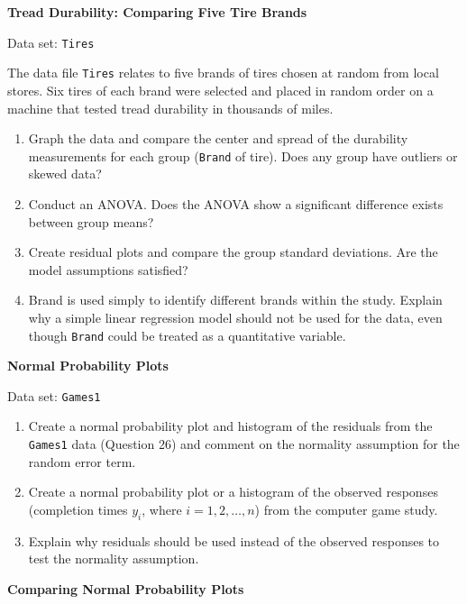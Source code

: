 \documentclass[
]{report}
\begin{document}
\begin{list}{E..}{ \setlength{\itemsep}{1.2em}}
  \item \textbf{Tread Durability: Comparing Five Tire Brands}

Data set: \texttt{Tires}

The data file \texttt{Tires} relates to five brands of tires chosen at random from local stores. Six tires of each brand were selected and placed in random order on a machine that tested tread durability in thousands of miles.

    \begin{enumerate}
      \item Graph the data and compare the center and spread of the durability measurements for each group (\texttt{Brand} of tire). Does any group have outliers or skewed data?
      \item Conduct an ANOVA. Does the ANOVA show a significant difference exists between group means?
      \item Create residual plots and compare the group standard deviations. Are the model assumptions satisfied?
      \item Brand is used simply to identify different brands within the study. Explain why a simple linear regression model should not be used for the data, even though \texttt{Brand} could be treated as a quantitative variable.
    \end{enumerate}

  \item \textbf{Normal Probability Plots}

Data set: \texttt{Games1}

    \begin{enumerate}
      \item Create a normal probability plot and histogram of the residuals from the \texttt{Games1} data (Question 26) and comment on the normality assumption for the random error term.
      \item Create a normal probability plot or a histogram of the observed responses (completion times $y_i$, where $i = 1, 2, \ldots, n$) from the computer game study.
      \item Explain why residuals should be used instead of the observed responses to test the normality assumption.
    \end{enumerate}

  \item \textbf{Comparing Normal Probability Plots}


\end{list}
\end{document}

